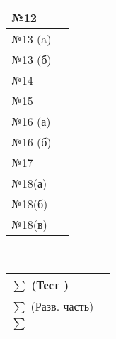 \documentclass[12pt]{article}
\begin{document}
\begin{landscape}
\begin{multicols}{2}
\begin{tabular}{ | l || l |   }
    №12 &  \\ \hline
    №13 (a) & \\ \hline
    №13 (б) & \\ \hline
    №14 &  \\ \hline
    №15 &  \\ \hline
    №16 (а)&  \\ \hline
    №16 (б)&  \\ \hline
    №17 &  \\ \hline
    №18(а) &  \\ \hline
    №18(б) &  \\ \hline
    №18(в) &  \\ \hline
    \hline
    \end{tabular}\\
    
    
    \begin{tabular}{| l || l |}
        \hline
    $\sum$ (Тест ) & \\ \hline
        $\sum$ (Разв. часть) & \\ \hline
        $\sum$  &  \\ \hline
        \end{tabular}
    \end{multicols}
\end{landscape}
\newpage
\end{document}
